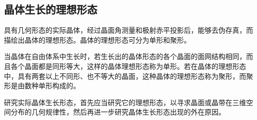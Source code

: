 \subsection{晶体生长的理想形态}
具有几何形态的实际晶体，经过晶面角测量和极射赤平投影后，能够去伪存真，而描绘出晶体的理想形态。晶体的理想形态可分为单形和聚形。

当晶体在自由体系中生长时，若生长出的晶体形态的各个晶面的面网结构相同，而且各个晶面都是同形等大，这样的晶体理想形态称为单形。若在晶体的理想形态中，具有两套以上不同形、也不等大的晶面，这种晶体的理想形态称为聚形，而聚形是由数种单形构成的。

研究实际晶体生长形态，首先应当研究它的理想形态，以寻求晶面或晶带在三维空间分布的几何规律性，然后再进一步研究晶体生长形态出现的外在原因。
